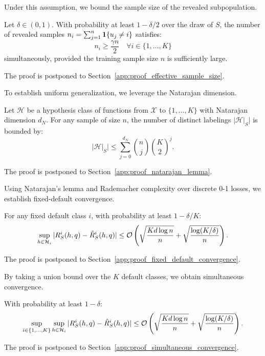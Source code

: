 Under this assumption, we bound the sample size of the revealed subpopulation.
\begin{lemma}
\label{lem:effective_sample_size}
Let $\delta \in (0, 1)$. With probability at least $1 - \delta/2$ over the draw of $S$, the number of revealed samples $n_i = \sum_{j=1}^n \mathbf{1}\{u_j \ne i\}$ satisfies:
\begin{equation}
    \label{eq:sample_size_concentration}
    n_i \ge \frac{\gamma n}{2} \quad \forall i \in \{1, \dots, K\}
\end{equation}
simultaneously, provided the training sample size $n$ is sufficiently large.
\end{lemma}
The proof is postponed to Section~\ref{app:proof_effective_sample_size}.

To establish uniform generalization, we leverage the Natarajan dimension.
\begin{lemma}
\label{lem:natarajan_lemma}
Let $\mathcal{H}$ be a hypothesis class of functions from $\mathcal{X}$ to $\{1, \dots, K\}$ with Natarajan dimension $d_N$. For any sample of size $n$, the number of distinct labelings $|\mathcal{H}|_S|$ is bounded by:
\begin{equation}
    \label{eq:natarajan_bound}
    |\mathcal{H}|_S| \le \sum_{j=0}^{d_N} \binom{n}{j} \binom{K}{2}^j.
\end{equation}
\end{lemma}
The proof is postponed to Section~\ref{app:proof_natarajan_lemma}.

Using Natarajan's lemma and Rademacher complexity over discrete 0-1 losses, we establish fixed-default convergence.
\begin{lemma}
\label{lem:fixed_default_convergence}
For any fixed default class $i$, with probability at least $1 - \delta/K$:
\begin{equation}
    \label{eq:fixed_default_bound}
    \sup_{h \in \mathcal{H}_i} |R^i_S(h, q) - \hat{R}^i_S(h, q)| \le \mathcal{O}\left( \sqrt{\frac{K d \log n}{n}} + \sqrt{\frac{\log(K/\delta)}{n}} \right).
\end{equation}
\end{lemma}
The proof is postponed to Section~\ref{app:proof_fixed_default_convergence}.

By taking a union bound over the $K$ default classes, we obtain simultaneous convergence.
\begin{lemma}
\label{lem:simultaneous_convergence}
With probability at least $1 - \delta$:
\begin{equation}
    \label{eq:simultaneous_bound}
    \sup_{i \in \{1, \dots, K\}} \sup_{h \in \mathcal{H}_i} |R^i_S(h, q) - \hat{R}^i_S(h, q)| \le \mathcal{O}\left( \sqrt{\frac{K d \log n}{n}} + \sqrt{\frac{\log(K/\delta)}{n}} \right).
\end{equation}
\end{lemma}
The proof is postponed to Section~\ref{app:proof_simultaneous_convergence}.

